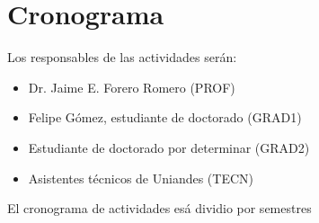 \section{Cronograma}

Los responsables de las actividades ser\'an:

\begin{itemize}
\item Dr. Jaime E. Forero Romero  (PROF)
\item Felipe G\'omez, estudiante de doctorado (GRAD1)
\item Estudiante de doctorado por determinar (GRAD2)
\item Asistentes t\'ecnicos de Uniandes (TECN)
\end{itemize}

El cronograma de actividades es\'a dividio por semestres

